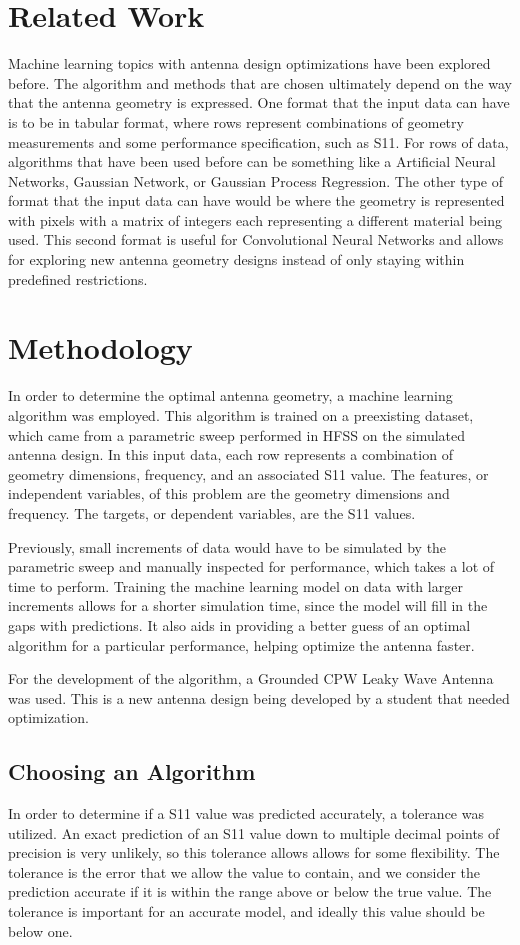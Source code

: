\documentclass[lettersize,journal]{IEEEtran}
\begin{document}
\section{Related Work}
Machine learning topics with antenna design optimizations have been explored before. The algorithm and methods that are chosen ultimately depend on the way that the antenna geometry is expressed. One format that the input data can have is to be in tabular format, where rows represent combinations of geometry measurements and some performance specification, such as S11. For rows of data, algorithms that have been used before can be something like a Artificial Neural Networks, Gaussian Network, or Gaussian Process Regression. The other type of format that the input data can have would be where the geometry is represented with pixels with a matrix of integers each representing a different material being used. This second format is useful for Convolutional Neural Networks and allows for exploring new antenna geometry designs instead of only staying within predefined restrictions.~\cite{wu_machine_2023} 


\section{Methodology}
In order to determine the optimal antenna geometry, a machine learning algorithm was employed. This algorithm is trained on a preexisting dataset, which came from a parametric sweep performed in HFSS on the simulated antenna design. In this input data, each row represents a combination of geometry dimensions, frequency, and an associated S11 value. The features, or independent variables, of this problem are the geometry dimensions and frequency. The targets, or dependent variables, are the S11 values. 

Previously, small increments of data would have to be simulated by the parametric sweep and manually inspected for performance, which takes a lot of time to perform. Training the machine learning model on data with larger increments allows for a shorter simulation time, since the model will fill in the gaps with predictions. It also aids in providing a better guess of an optimal algorithm for a particular performance, helping optimize the antenna faster. 

For the development of the algorithm, a Grounded CPW Leaky Wave Antenna was used. This is a new antenna design being developed by a student that needed optimization.

\subsection{Choosing an Algorithm}
In order to determine if a S11 value was predicted accurately, a tolerance was utilized. An exact prediction of an S11 value down to multiple decimal points of precision is very unlikely, so this tolerance allows allows for some flexibility. The tolerance is the error that we allow the value to contain, and we consider the prediction accurate if it is within the range above or below the true value. The tolerance is important for an accurate model, and ideally this value should be below one.
\end{document}
